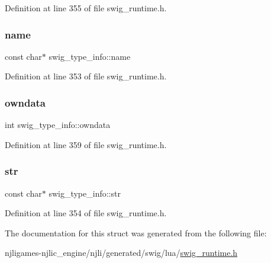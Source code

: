 Definition at line 355 of file swig\+\_\+runtime.\+h.

\mbox{\label{structswig__type__info_a90a9c6a25aa3e923978005ecbe23ad60}} 
\subsubsection{\texorpdfstring{name}{name}}
{\footnotesize\ttfamily const char$\ast$ swig\+\_\+type\+\_\+info\+::name}



Definition at line 353 of file swig\+\_\+runtime.\+h.

\mbox{\label{structswig__type__info_a93c25d5903cbfcb82208eea7227c32bd}} 
\subsubsection{\texorpdfstring{owndata}{owndata}}
{\footnotesize\ttfamily int swig\+\_\+type\+\_\+info\+::owndata}



Definition at line 359 of file swig\+\_\+runtime.\+h.

\mbox{\label{structswig__type__info_abbe7cc58a083feb4329b748643324064}} 
\subsubsection{\texorpdfstring{str}{str}}
{\footnotesize\ttfamily const char$\ast$ swig\+\_\+type\+\_\+info\+::str}



Definition at line 354 of file swig\+\_\+runtime.\+h.



The documentation for this struct was generated from the following file\+:\begin{DoxyCompactItemize}
\item 
njligames-\/njlic\+\_\+engine/njli/generated/swig/lua/\mbox{\hyperlink{swig__runtime_8h}{swig\+\_\+runtime.\+h}}\end{DoxyCompactItemize}
